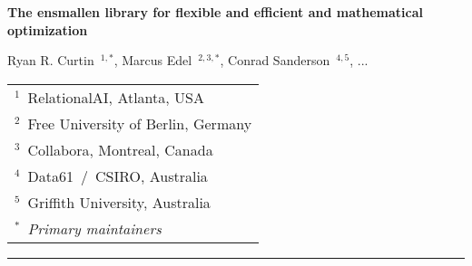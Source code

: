 \documentclass[10pt]{article}
\begin{document}
\pagestyle{empty}

\begin{center}

{\Large\bf The ensmallen library for flexible and efficient and  mathematical optimization}

\vspace{1.5ex}
  {Ryan R. Curtin~{$^{1,*}$}, Marcus Edel~{$^{2,3,*}$}, Conrad Sanderson~{$^{4,5}$}, ...}
\vspace{1.5ex}


\begin{tabular}{l}
$^1$~RelationalAI, Atlanta, USA\\
$^2$~Free University of Berlin, Germany\\
$^3$~Collabora, Montreal, Canada\\
$^4$~Data61~/~CSIRO, Australia\\
$^5$~Griffith University, Australia\\
$^*$~{\it Primary maintainers}
\end{tabular}

\end{center}




\vspace{4ex}
\hrule





  
  
  

\clearpage


\clearpage
\newpage

\appendix
{}
  
  
  

\clearpage
\newpage


\end{document}
